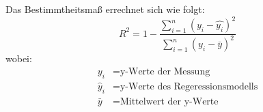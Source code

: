 Das Bestimmtheitsmaß errechnet sich wie folgt: 
\begin{equation}
R^{2} = 1 - \frac{\sum \limits_{i=1}^n (y_i - \hat{y_i})^{2}}{\sum \limits_{i=1}^n (y_i - \bar{y})^{2}}
\end{equation}
wobei:
\begin{align*}
y_i &= \text{y-Werte der Messung}\\
\hat{y}_i &= \text{y-Werte des Regeressionsmodells}\\
\bar{y} &= \text{Mittelwert der y-Werte}
\end{align*}